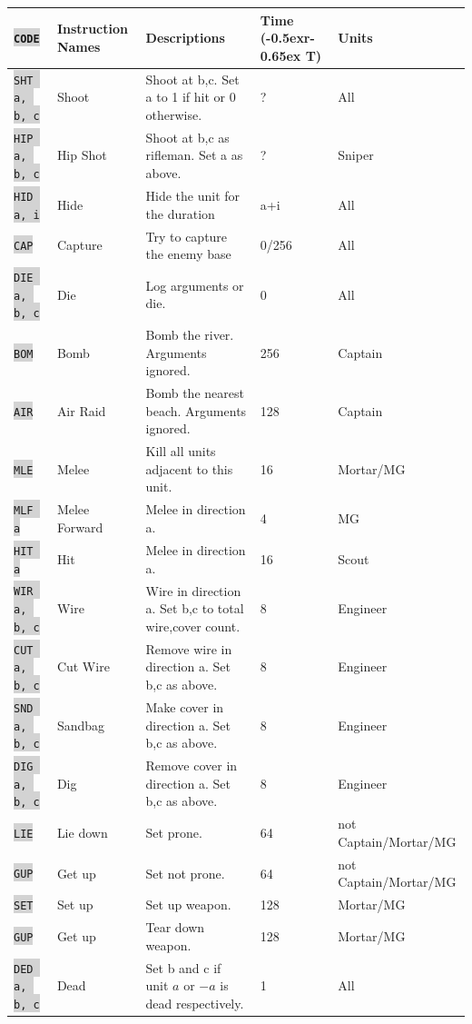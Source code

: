 \documentclass{article}
\newcommand{\vnscode}[1]{\colorbox{lightgray}{\lstinline[language=vns]{#1}}}
\newcommand{\RT}{\lower-0.5ex\hbox{r}\kern-0.65ex T}
\begin{document}
\begin{minipage}{\textwidth}
\label{table:combat}
\centering
\begin{tabular}{lllll}
    \hline \vnscode{CODE} & Instruction Names & Descriptions & Time (\RT) & Units \\ \hline
    \vnscode{SHT a, b, c} & Shoot & Shoot at b,c. Set a to 1 if hit or 0 otherwise. & ? & All \\
    \vnscode{HIP a, b, c} & Hip Shot & Shoot at b,c as rifleman. Set a as above. & ? & Sniper \\
    \vnscode{HID a, i} & Hide & Hide the unit for the duration & a+i & All \\
    \vnscode{CAP} & Capture & Try to capture the enemy base & 0/256 & All \\
    \vnscode{DIE a, b, c} & Die & Log arguments or die. & 0 & All \\
    \vnscode{BOM} & Bomb & Bomb the river. Arguments ignored. & 256 & Captain \\
    \vnscode{AIR} & Air Raid & Bomb the nearest beach. Arguments ignored. & 128 & Captain \\
    \vnscode{MLE} & Melee & Kill all units adjacent to this unit. & 16 & Mortar/MG \\
    \vnscode{MLF a} & Melee Forward & Melee in direction a. & 4 & MG \\
    \vnscode{HIT a} & Hit & Melee in direction a. & 16 & Scout \\
    \vnscode{WIR a, b, c} & Wire & Wire in direction a. Set b,c to total wire,cover count. & 8 & Engineer \\
    \vnscode{CUT a, b, c} & Cut Wire & Remove wire in direction a. Set b,c as above. & 8 & Engineer \\
    \vnscode{SND a, b, c} & Sandbag & Make cover in direction a. Set b,c as above. & 8 & Engineer \\
    \vnscode{DIG a, b, c} & Dig & Remove cover in direction a. Set b,c as above. & 8 & Engineer \\
    \vnscode{LIE} & Lie down & Set prone. & 64 & not Captain/Mortar/MG \\
    \vnscode{GUP} & Get up & Set not prone. & 64 & not Captain/Mortar/MG \\
    \vnscode{SET} & Set up & Set up weapon. & 128 & Mortar/MG \\
    \vnscode{GUP} & Get up & Tear down weapon. & 128 & Mortar/MG \\
    \vnscode{DED a, b, c} & Dead & Set b and c if unit $a$ or $-a$ is dead respectively. & 1 & All \\

\end{tabular}
\end{minipage}
\end{document}
